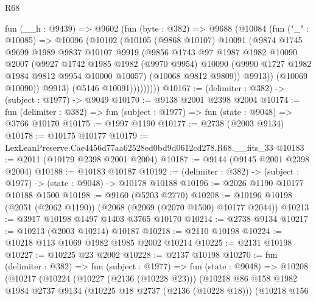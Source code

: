 \begin{lexlean}{R68}
\begin{coremodule}
            fun (__h : @9439) =>
            @9602
              (fun (byte : @382) =>
              @9688
                (@10084
                  (fun ("_" : @10085) =>
                  @10096
                    (@10102
                      (@10105
                        (@9868 @10107)
                        @10091
                        (@9874
                          @1745
                          @9699
                          @1989
                          @9837
                          @10107
                          @9919
                          (@9856
                            @1743
                            @97
                            @1987
                            @1982
                            @10090
                            @2007
                            (@9927
                              @1742
                              @1985
                              @1982
                              (@9970 @9954)
                              @10090
                              (@9990 @1727 @1982 @1984 @9812 @9954 @10000 @10057)
                              (@10068 @9812 @9809))
                            @9913))
                        (@10069 @10090))
                      @9913)
                    (@5146 @10091)))))))))
@10167 := (delimiter : @382) -> (subject : @1977) -> @9049
@10170 := @9138 @2001 @2398 @2004
@10174 := fun (delimiter : @382) => fun (subject : @1977) => fun (state : @9048) => @3766 @10170
@10175 := @1997 @1190
@10177 := @2738 (@2003 @9134)
@10178 := @10175 @10177
@10179 := LexLeanPreserve.Cae4456d77aa62528ed0bd9d0612cd278.R68.__fits_33
@10183 := @2011 (@10179 @2398 @2001 @2004)
@10187 := @9144 (@9145 @2001 @2398 @2004)
@10188 := @10183 @10187
@10192 := (delimiter : @382) -> (subject : @1977) -> (state : @9048) -> @10178 @10188
@10196 := @2026 @1190 @10177 @10188 @1500
@10198 := @9160 (@5203 @2770)
@10208 := @10196 @10198 (@2051 (@2062 @1190)) (@2068 (@2069 (@2070 @1500) @10177 @2044))
@10213 := @3917 @10198 @1497 @1403 @3765 @10170
@10214 := @2738 @9134
@10217 := @10213 (@2003 @10214) @10187
@10218 := @2110 @10198
@10224 := @10218 @113 @1069 @1982 @1985 @2002 @10214
@10225 := @2131 @10198
@10227 := @10225 @23 @2002
@10228 := @2137 @10198
@10270 := fun (delimiter : @382) =>
  fun (subject : @1977) =>
  fun (state : @9048) =>
  @10208
    (@10217
      (@10224
        (@10227 (@2136 (@10228 @23)))
        (@10218
          @86
          @158
          @1982
          @1984
          @2737
          @9134
          (@10225 @18 @2737 (@2136 (@10228 @18)))
          (@10218
            @156

\end{coremodule}
\end{lexlean}
